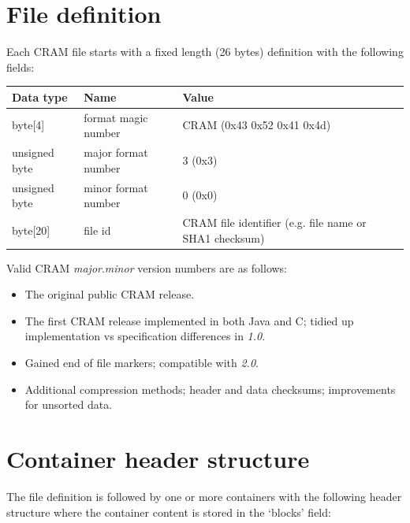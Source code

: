 \documentclass[a4paper]{article}
\begin{document}
\section{\textbf{File definition}}

Each CRAM file starts with a fixed length (26 bytes) definition with the following 
fields:

\begin{tabular}{|l|l|l|}
\hline
\textbf{Data type} & \textbf{Name} & \textbf{Value}\tabularnewline
\hline
byte[4] & format magic number & CRAM (0x43 0x52 0x41 0x4d)\tabularnewline
\hline
unsigned byte & major format number & 3 (0x3)\tabularnewline
\hline
unsigned byte & minor format number & 0 (0x0)\tabularnewline
\hline
byte[20] & file id & CRAM file identifier (e.g. file name or SHA1 checksum)\tabularnewline
\hline
\end{tabular}

Valid CRAM \textit{major}.\textit{minor} version numbers are as follows:

\begin{itemize}
\item[\textit{1.0}]
The original public CRAM release.

\item[\textit{2.0}]
The first CRAM release implemented in both Java and C; tidied up
implementation vs specification differences in \textit{1.0}.

\item[\textit{2.1}]
Gained end of file markers; compatible with \textit{2.0}.

\item[\textit{3.0}]
Additional compression methods; header and data checksums;
improvements for unsorted data.
\end {itemize}

\section{\textbf{Container header structure}}
\label{sec:container}

The file definition is followed by one or more containers with the following header 
structure where the container content is stored in the `blocks' field:
\end{document}
